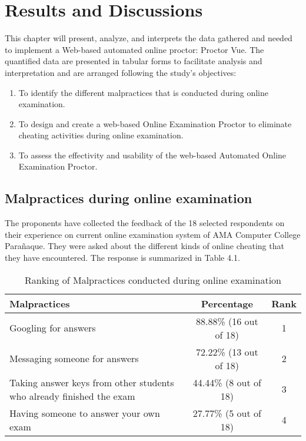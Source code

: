 \chapter{Results and Discussions}

This chapter will present, analyze, and interprets the data gathered and needed to implement a Web-based automated online proctor: Proctor Vue.
The quantified data are presented in tabular forms to facilitate analysis and interpretation and are arranged following the study’s objectives:

\begin{enumerate}
   \item To identify the different malpractices that is conducted during online examination.
   \item To design and create a web-based Online Examination Proctor to eliminate cheating activities during online examination.
   \item To assess the effectivity and usability of the web-based Automated Online Examination Proctor.
\end{enumerate}

\section{Malpractices during online examination}

The proponents have collected the feedback of the 18 selected respondents on their experience on current online examination system of AMA Computer College Parañaque.
They were asked about the different kinds of online cheating that they have encountered.
The response is summarized in Table 4.1.

\pagebreak

\begin{table}[h!]
   \begin{center}
      \begin{tabular}{|m{20em}|c|c|}
         \hline
         \textbf{Malpractices}                                                & \textbf{Percentage}    & \textbf{Rank} \\
         \hline
         Googling for answers                                                 & 88.88\% (16 out of 18) & 1             \\
         \hline
         Messaging someone for answers                                        & 72.22\% (13 out of 18) & 2             \\
         \hline
         Taking answer keys from other students who already finished the exam & 44.44\% (8 out of 18)  & 3             \\
         \hline
         Having someone to answer your own exam                               & 27.77\% (5 out of 18)  & 4             \\
         \hline
      \end{tabular}
   \end{center}
   \caption{Ranking of Malpractices conducted during online examination}
\end{table}

